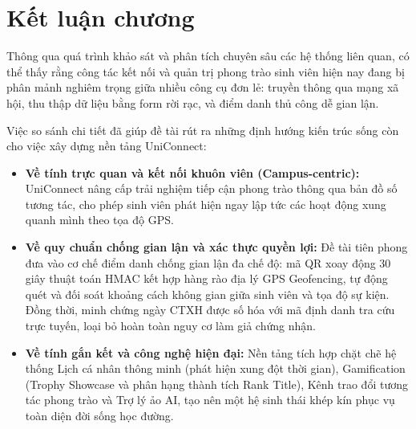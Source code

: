\section{Kết luận chương}

Thông qua quá trình khảo sát và phân tích chuyên sâu các hệ thống liên quan, có thể thấy rằng công tác kết nối và quản trị phong trào sinh viên hiện nay đang bị phân mảnh nghiêm trọng giữa nhiều công cụ đơn lẻ: truyền thông qua mạng xã hội, thu thập dữ liệu bằng form rời rạc, và điểm danh thủ công dễ gian lận.

Việc so sánh chi tiết đã giúp đề tài rút ra những định hướng kiến trúc sống còn cho việc xây dựng nền tảng UniConnect:

\begin{itemize}
    \item \textbf{Về tính trực quan và kết nối khuôn viên (Campus-centric):} UniConnect nâng cấp trải nghiệm tiếp cận phong trào thông qua bản đồ số tương tác, cho phép sinh viên phát hiện ngay lập tức các hoạt động xung quanh mình theo tọa độ GPS.
    \item \textbf{Về quy chuẩn chống gian lận và xác thực quyền lợi:} Đề tài tiên phong đưa vào cơ chế điểm danh chống gian lận đa chế độ: mã QR xoay động 30 giây thuật toán HMAC kết hợp hàng rào địa lý GPS Geofencing, tự động quét và đối soát khoảng cách không gian giữa sinh viên và tọa độ sự kiện. Đồng thời, minh chứng ngày CTXH được số hóa với mã định danh tra cứu trực tuyến, loại bỏ hoàn toàn nguy cơ làm giả chứng nhận.
    \item \textbf{Về tính gắn kết và công nghệ hiện đại:} Nền tảng tích hợp chặt chẽ hệ thống Lịch cá nhân thông minh (phát hiện xung đột thời gian), Gamification (Trophy Showcase và phân hạng thành tích Rank Title), Kênh trao đổi tương tác phong trào và Trợ lý ảo AI, tạo nên một hệ sinh thái khép kín phục vụ toàn diện đời sống học đường.
\end{itemize}